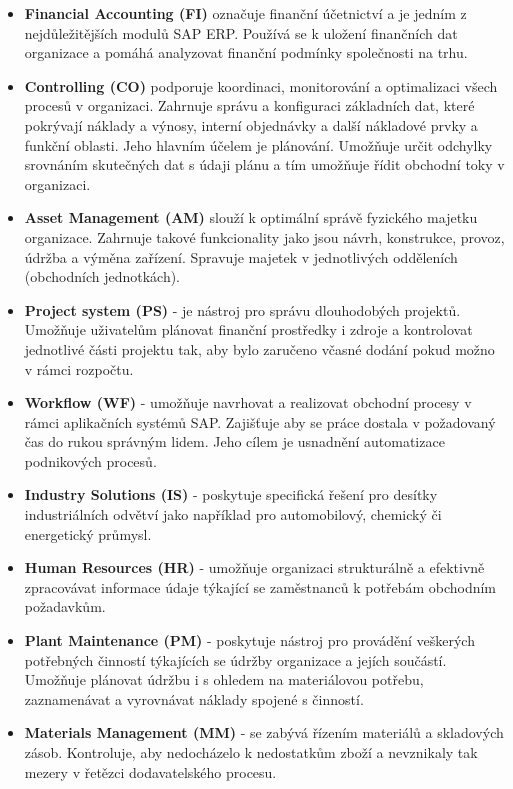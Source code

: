 \documentclass[thesis=M,czech]{FITthesis}[2012/06/26]
\begin{document}
\begin{itemize}
	\item
	\textbf{Financial Accounting (FI)} označuje finanční účetnictví a je jedním z nejdůležitějších modulů SAP ERP. Používá se k uložení finančních dat organizace a pomáhá analyzovat finanční podmínky společnosti na trhu.
	\item
	\textbf{Controlling (CO)} podporuje koordinaci, monitorování a optimalizaci všech procesů v organizaci. Zahrnuje správu a konfiguraci základních dat, které pokrývají náklady a výnosy, interní objednávky a další nákladové prvky a funkční oblasti. Jeho hlavním účelem je plánování. Umožňuje určit odchylky srovnáním skutečných dat s údaji plánu a tím umožňuje řídit obchodní toky v organizaci.
	\item
	\textbf{Asset Management (AM)} slouží k optimální správě fyzického majetku organizace. Zahrnuje takové funkcionality jako jsou návrh, konstrukce, provoz, údržba a výměna zařízení. Spravuje majetek v jednotlivých odděleních (obchodních jednotkách).
	\item
	\textbf{Project system (PS)} - je nástroj pro správu dlouhodobých projektů. Umožňuje uživatelům plánovat finanční prostředky i zdroje a kontrolovat jednotlivé části projektu tak, aby bylo zaručeno včasné dodání pokud možno v rámci rozpočtu.
	\item
	\textbf{Workflow (WF)} - umožňuje navrhovat a realizovat obchodní procesy v rámci aplikačních systémů SAP. Zajišťuje aby se práce dostala v požadovaný čas do rukou správným lidem. Jeho cílem je usnadnění automatizace podnikových procesů.
	\item
	\textbf{Industry Solutions (IS)} - poskytuje specifická řešení pro desítky industriálních odvětví jako například pro automobilový, chemický či energetický průmysl.
	\item
	\textbf{Human Resources (HR)} - umožňuje organizaci strukturálně a efektivně zpracovávat informace údaje týkající se zaměstnanců k potřebám obchodním požadavkům.
	\item
	\textbf{Plant Maintenance (PM)} - poskytuje nástroj pro provádění veškerých potřebných činností týkajících se údržby organizace a jejích součástí. Umožňuje plánovat údržbu i s ohledem na materiálovou potřebu, zaznamenávat a vyrovnávat náklady spojené s činností.
	\item
	\textbf{Materials Management (MM)} - se zabývá řízením materiálů a skladových zásob. Kontroluje, aby nedocházelo k nedostatkům zboží a nevznikaly tak mezery v řetězci dodavatelského procesu.

\end{itemize}
\end{document}
